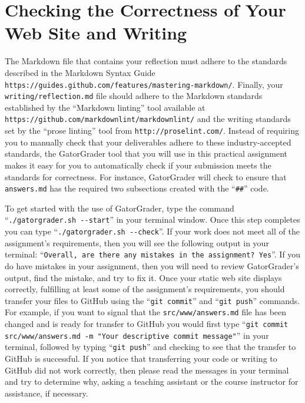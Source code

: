 \documentclass[11pt]{article}
\newcommand{\mainprogram}{\lstinline{answers.md}}
\newcommand{\mainprogramsource}{\lstinline{src/www/answers.md}}
\newcommand{\reflection}{\lstinline{writing/reflection.md}}
\newcommand{\gatorgraderstart}{\command{./gatorgrader.sh --start}}
\newcommand{\gatorgradercheck}{\command{./gatorgrader.sh --check}}
\newcommand{\gitcommit}{\command{git commit}}
\newcommand{\gitpush}{\command{git push}}
\newcommand{\gitcommitmainprogram}{\command{git commit src/www/answers.md -m "Your
descriptive commit message"}}
\newcommand{\command}[1]{``\lstinline{#1}''}
\newcommand{\url}[1]{\lstinline{#1}}
\newcommand{\step}[1]{``{#1}''}
\begin{document}
\section*{Checking the Correctness of Your Web Site and Writing}

The Markdown file that contains your reflection must adhere to the standards described in the Markdown Syntax Guide
\url{https://guides.github.com/features/mastering-markdown/}. Finally, your \reflection{} file should adhere to the
Markdown standards established by the \step{Markdown linting} tool available at
\url{https://github.com/markdownlint/markdownlint/} and the writing standards set by the \step{prose linting} tool from
\url{http://proselint.com/}. Instead of requiring you to manually check that your deliverables adhere to these
industry-accepted standards, the GatorGrader tool that you will use in this practical assignment makes it easy for you
to automatically check if your submission meets the standards for correctness. For instance, GatorGrader will check to
ensure that \mainprogram{} has the required two subsections created with the \command{##} code.

To get started with the use of GatorGrader, type the command \gatorgraderstart{} in your terminal window. Once this step
completes you can type \gatorgradercheck{}. If your work does not meet all of the assignment's requirements, then you
will see the following output in your terminal: \command{Overall, are there any mistakes in the assignment? Yes}. If you
do have mistakes in your assignment, then you will need to review GatorGrader's output, find the mistake, and try to fix
it. Once your static web site displays correctly, fulfilling at least some of the assignment's requirements, you should
transfer your files to GitHub using the \gitcommit{} and \gitpush{} commands. For example, if you want to signal that
the \mainprogramsource{} file has been changed and is ready for transfer to GitHub you would first type
\gitcommitmainprogram{} in your terminal, followed by typing \gitpush{} and checking to see that the transfer to GitHub
is successful. If you notice that transferring your code or writing to GitHub did not work correctly, then please read
the messages in your terminal and try to determine why, asking a teaching assistant or the course instructor for
assistance, if necessary.
\end{document}
